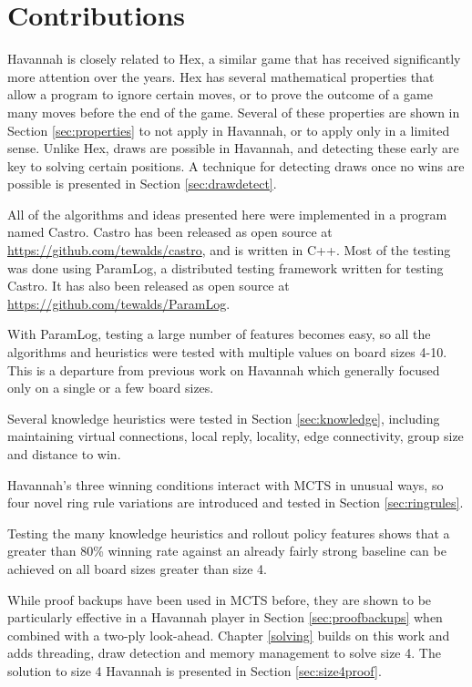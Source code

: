 \section{Contributions}

Havannah is closely related to Hex, a similar game that has received significantly more attention over the years. Hex has several mathematical properties that allow a program to ignore certain moves, or to prove the outcome of a game many moves before the end of the game. Several of these properties are shown in Section \ref{sec:properties} to not apply in Havannah, or to apply only in a limited sense. Unlike Hex, draws are possible in Havannah, and detecting these early are key to solving certain positions. A technique for detecting draws once no wins are possible is presented in Section \ref{sec:drawdetect}.

All of the algorithms and ideas presented here were implemented in a program named Castro. Castro has been released as open source at \url{https://github.com/tewalds/castro}, and is written in C++. Most of the testing was done using ParamLog, a distributed testing framework written for testing Castro. It has also been released as open source at \url{https://github.com/tewalds/ParamLog}.

With ParamLog, testing a large number of features becomes easy, so all the algorithms and heuristics were tested with multiple values on board sizes 4-10. This is a departure from previous work on Havannah which generally focused only on a single or a few board sizes.

Several knowledge heuristics were tested in Section \ref{sec:knowledge}, including maintaining virtual connections, local reply, locality, edge connectivity, group size and distance to win.

Havannah's three winning conditions interact with MCTS in unusual ways, so four novel ring rule variations are introduced and tested in Section \ref{sec:ringrules}.

Testing the many knowledge heuristics and rollout policy features shows that a greater than 80\% winning rate against an already fairly strong baseline can be achieved on all board sizes greater than size 4.

While proof backups have been used in MCTS before, they are shown to be particularly effective in a Havannah player in Section \ref{sec:proofbackups} when combined with a two-ply look-ahead. Chapter \ref{solving} builds on this work and adds threading, draw detection and memory management to solve size 4. The solution to size 4 Havannah is presented in Section \ref{sec:size4proof}.


